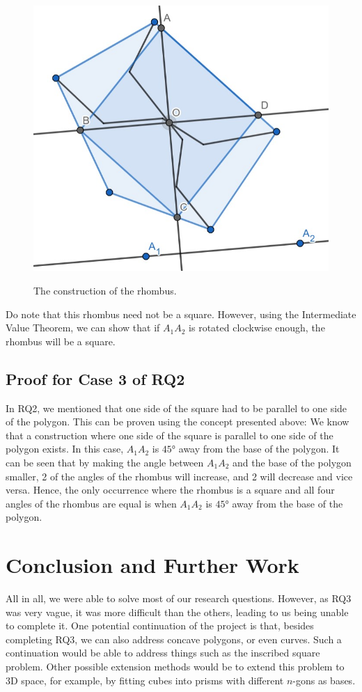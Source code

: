 \documentclass[12pt]{scrartcl}
\begin{document}
\begin{figure}[htpb]
	\centering
	\includegraphics[scale=.75]{images/rq3_1_4.jpg}
	\label{fig:rq3_1_4_img}
	\caption{The construction of the rhombus.}
\end{figure}

Do note that this rhombus need not be a square. However, using the Intermediate Value Theorem, we can show that if $A_{1}A_{2}$ is rotated clockwise enough, the rhombus will be a square.

\subsection{Proof for Case 3 of RQ2}
In RQ2, we mentioned that one side of the square had to be parallel to one side of the polygon. This can be proven using the concept presented above:
We know that a construction where one side of the square is parallel to one side of the polygon exists. In this case, $A_{1}A_{2}$ is $\ang{45}$ away from the base of the polygon. It can be seen that by making the angle between $A_{1}A_{2}$ and the base of the polygon smaller, 2 of the angles of the rhombus will increase, and 2 will decrease and vice versa.
Hence, the only occurrence where the rhombus is a square and all four angles of the rhombus are equal is when $A_{1}A_{2}$ is $\ang{45}$ away from the base of the polygon.

\section{Conclusion and Further Work}
All in all, we were able to solve most of our research questions. However, as RQ3 was very vague, it was more difficult than the others, leading to us being unable to complete it. One potential continuation of the project is that, besides completing RQ3, we can also address concave polygons, or even curves. Such a continuation would be able to address things such as the inscribed square problem. Other possible extension methods would be to extend this problem to 3D space, for example, by fitting cubes into prisms with different $n$-gons as bases.   

\printbibliography
\end{document}
